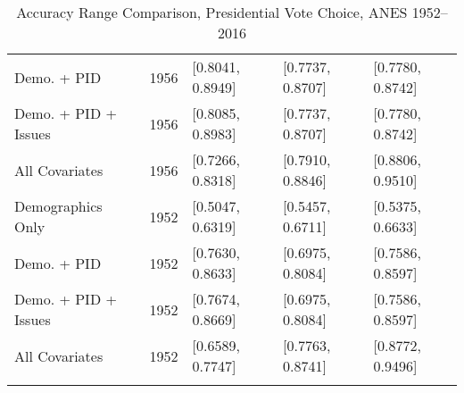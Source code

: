 \begin{longtable}{lrlll}
  Demo. + PID & 1956 & [0.8041, 0.8949] & [0.7737, 0.8707] & [0.7780, 0.8742] \\ 
  Demo. + PID + Issues & 1956 & [0.8085, 0.8983] & [0.7737, 0.8707] & [0.7780, 0.8742] \\ 
  All Covariates & 1956 & [0.7266, 0.8318] & [0.7910, 0.8846] & [0.8806, 0.9510] \\ 
  Demographics Only & 1952 & [0.5047, 0.6319] & [0.5457, 0.6711] & [0.5375, 0.6633] \\ 
  Demo. + PID & 1952 & [0.7630, 0.8633] & [0.6975, 0.8084] & [0.7586, 0.8597] \\ 
  Demo. + PID + Issues & 1952 & [0.7674, 0.8669] & [0.6975, 0.8084] & [0.7586, 0.8597] \\ 
  All Covariates & 1952 & [0.6589, 0.7747] & [0.7763, 0.8741] & [0.8772, 0.9496] \\ 
   \bottomrule
\caption{Accuracy Range Comparison, Presidential Vote Choice, ANES 1952--2016} 
\label{tab:ANES_prezvote_accuracy}
\end{longtable}

